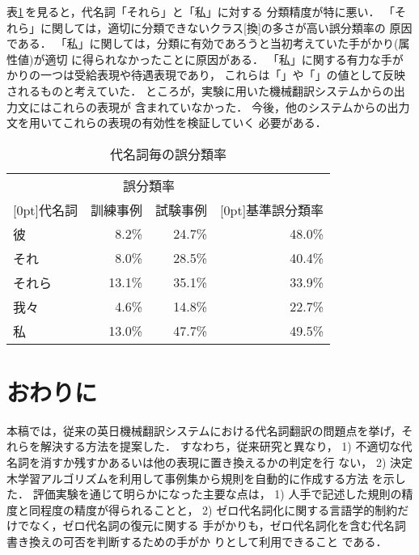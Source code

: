 表\ref{tab:pron-freq-result}\,を見ると，代名詞「それら」と「私」に対する
分類精度が特に悪い．
「それら」に関しては，適切に分類できないクラス[換]の多さが高い誤分類率の
原因である．
「私」に関しては，分類に有効であろうと当初考えていた手がかり(属性値)が適切
に得られなかったことに原因がある．
「私」に関する有力な手がかりの一つは受給表現や待遇表現であり，
これらは「\GVNRSEM」や「\GVNRFZKG」の値として反映されるものと考えていた．
ところが，実験に用いた機械翻訳システムからの出力文にはこれらの表現が
含まれていなかった．
今後，他のシステムからの出力文を用いてこれらの表現の有効性を検証していく
必要がある．
\begin{table}[htbp]
\caption{代名詞毎の誤分類率}
\label{tab:pron-freq-result}
\begin{center}
\begin{tabular}{|l||r|r|r|}\hline
 & \multicolumn{2}{|c|}{誤分類率} & \\\cline{2-3}
\multicolumn{1}{|c||}{\raisebox{1.5ex}[0pt]{代名詞}} & 
\multicolumn{1}{c|}{訓練事例} & \multicolumn{1}{|c|}{試験事例} & 
\multicolumn{1}{c|}{\raisebox{1.5ex}[0pt]{基準誤分類率}} \\\hline\hline
彼     &  8.2\% & 24.7\% & 48.0\% \\
それ   &  8.0\% & 28.5\% & 40.4\% \\
それら & 13.1\% & 35.1\% & 33.9\% \\
我々   &  4.6\% & 14.8\% & 22.7\% \\
私     & 13.0\% & 47.7\% & 49.5\% \\\hline
\end{tabular}
\end{center}
\end{table}

\section{おわりに}

本稿では，従来の英日機械翻訳システムにおける代名詞翻訳の問題点を挙げ，そ
れらを解決する方法を提案した．
すなわち，従来研究と異なり，
1) 不適切な代名詞を消すか残すかあるいは他の表現に置き換えるかの判定を行
ない，
2) 決定木学習アルゴリズムを利用して事例集から規則を自動的に作成する方法
を示した．
評価実験を通じて明らかになった主要な点は，
1) 人手で記述した規則の精度と同程度の精度が得られることと，
2) ゼロ代名詞化に関する言語学的制約だけでなく，ゼロ代名詞の復元に関する
手がかりも，ゼロ代名詞化を含む代名詞書き換えの可否を判断するための手がか
りとして利用できること
である．

